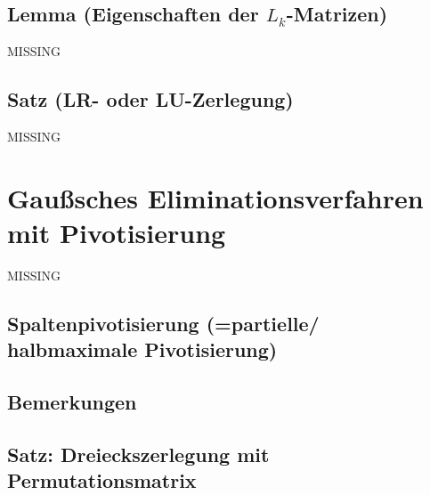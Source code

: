 \documentclass[ngerman,fontsize=11pt, paper=a4, parskip=false, titlepage=false, toc=bib]{scrbook}
\begin{document}
\subsection{Lemma (Eigenschaften der $L_k$-Matrizen)} \label{2.1.12} 
MISSING


\subsection{Satz (LR- oder LU-Zerlegung)} 
MISSING

\section{Gaußsches Eliminationsverfahren mit Pivotisierung}
MISSING
\subsection{Spaltenpivotisierung (=partielle/ halbmaximale Pivotisierung)} 

\subsection{Bemerkungen}

\subsection{Satz: Dreieckszerlegung mit Permutationsmatrix} \label{2.2.4} 
\end{document}

